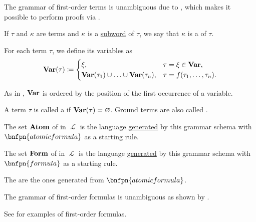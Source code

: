 \begin{definition}
\begin{thmenum}
    The grammar of first-order terms is unambiguous due to , which makes it possible to perform proofs via .

     If \( \tau \) and \( \kappa \) are terms and \( \kappa \) is a \hyperref[def:formal_language/subword]{subword} of \( \tau \), we say that \( \kappa \) is a  of \( \tau \).

     For each term \( \tau \), we define its variables as
    \begin{equation}\label{eq:def:first_order_syntax/term_variables}
      \operatorname{\mathbf{Var}}(\tau) \coloneqq \begin{cases}
        \xi,                                                        &\tau = \xi \in \operatorname{\mathbf{Var}}, \\
        \operatorname{\mathbf{Var}}(\tau_1) \cup \ldots \cup \operatorname{\mathbf{Var}}(\tau_n), &\tau = f(\tau_1, \ldots, \tau_n).
      \end{cases}
    \end{equation}

    As in , \( \operatorname{\mathbf{Var}} \) is ordered by the position of the first occurrence of a variable.

     A term \( \tau \) is called a  if \( \operatorname{\mathbf{Var}}(\tau) = \varnothing \). Ground terms are also called .

     The set \( \operatorname{\mathbf{Atom}} \) of  in \( \mscrL \) is the language \hyperref[def:grammar_derivation/grammar_language]{generated} by this grammar schema with \( \bnfpn{atomic formula} \) as a starting rule.

     The set \( \operatorname{\mathbf{Form}} \) of  in \( \mscrL \) is the language \hyperref[def:grammar_derivation/grammar_language]{generated} by this grammar schema with \( \bnfpn{formula} \) as a starting rule.

    The  are the ones generated from \( \bnfpn{atomic formula} \).

    The grammar of first-order formulas is unambiguous as shown by .

    See  for examples of first-order formulas.


\end{thmenum}
\end{definition}
